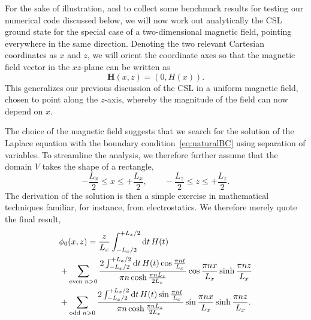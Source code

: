 \documentclass[pdflatex,iicol,sn-mathphys-num]{sn-jnl}
\let\p=\phi
\newcommand{\dd}{\text{d}}%
\newcommand{\vek}[1]{\bm{#1}}%
\begin{document}
For the sake of illustration, and to collect some benchmark results for testing our numerical code discussed below, we will now work out analytically the CSL ground state for the special case of a two-dimensional magnetic field, pointing everywhere in the same direction. Denoting the two relevant Cartesian coordinates as $x$ and $z$, we will orient the coordinate axes so that the magnetic field vector in the $xz$-plane can be written as
\begin{equation}
\vek H(x,z)=(0,H(x)).
\label{eq:2d_straightH}
\end{equation}
This generalizes our previous discussion of the CSL in a uniform magnetic field, chosen to point along the $z$-axis, whereby the magnitude of the field can now depend on $x$.

The choice of the magnetic field suggests that we search for the solution of the Laplace equation with the boundary condition~\eqref{eq:naturalBC} using separation of variables. To streamline the analysis, we therefore further assume that the domain $V$ takes the shape of a rectangle,
\begin{equation}
-\frac{L_x}2\leq x\leq+\frac{L_x}2,\qquad
-\frac{L_z}2\leq z\leq+\frac{L_z}2.
\label{eq:rectangle}
\end{equation}
The derivation of the solution is then a simple exercise in mathematical techniques familiar, for instance, from electrostatics. We therefore merely quote the final result,
\begin{align}
\label{eq:solseparation}
&\p_0(x,z)=\frac{z}{L_x}\int_{-{L_x}/2}^{+{L_x}/2}\dd t\,H(t)\\
\notag
&+\sum_{\text{even }n>0}\frac{2\int_{-{L_x}/2}^{+{L_x}/2}\dd t\,H(t)\cos\frac{\pi nt}{L_x}}{\pi n\cosh\frac{\pi nL_z}{2L_x}}\cos\frac{\pi nx}{L_x}\sinh\frac{\pi nz}{L_x}\\
\notag
&+\sum_{\text{odd }n>0}\frac{2\int_{-{L_x}/2}^{+{L_x}/2}\dd t\,H(t)\sin\frac{\pi nt}{L_x}}{\pi n\cosh\frac{\pi nL_z}{2L_x}}\sin\frac{\pi nx}{L_x}\sinh\frac{\pi nz}{L_x}.
\end{align}
\end{document}
